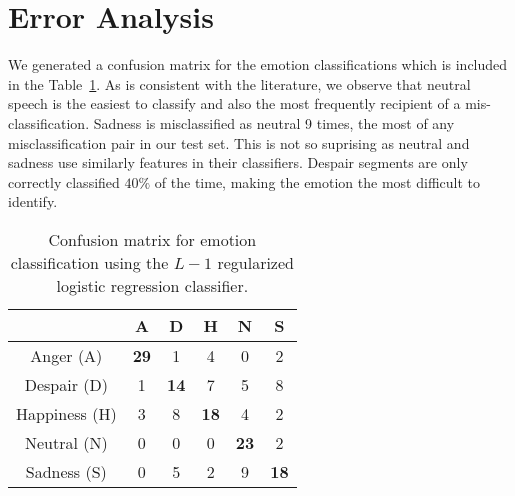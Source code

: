 \documentclass[twocolumn, 11pt]{article}
\begin{document}
\section{Error Analysis}

We generated a confusion matrix for the emotion classifications which is
included in the Table~\ref{tab:confusion}. As is consistent with the
literature, we observe that neutral speech is the easiest to classify and also
the most frequently recipient of a mis-classification. Sadness is misclassified
as neutral 9 times, the most of any misclassification pair in our test set.
This is not so suprising as neutral and sadness use similarly features in their
classifiers.  Despair segments are only correctly classified $40\%$ of the
time, making the emotion the most difficult to identify.

\begin{table}[tbp]
\centering
\begin{tabular}{*{6}{c}}\toprule
&A & D & H & N & S  \\ \midrule
Anger (A) & \bf 29 & 1 & 4 & 0 & 2 \\
Despair (D) & 1 & \bf 14 & 7 & 5 & 8 \\
Happiness (H) & 3 & 8 & \bf 18 & 4 & 2\\
Neutral (N) & 0 & 0 & 0 & \bf 23 & 2\\
Sadness (S) & 0 & 5 & 2 & 9 & \bf 18\\
\bottomrule
\end{tabular}
\caption{\footnotesize Confusion matrix for emotion classification using the
$L-1$ regularized logistic regression classifier.}\label{tab:confusion}
\end{table}
\end{document}
